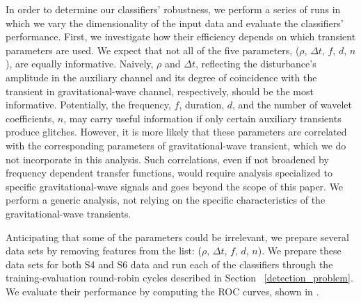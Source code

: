 \documentclass[prd, twocolumn, lengthcheck, superscriptaddress, showpacs, letterpaper, nofootinbib]{revtex4-1}
\begin{document}
In order to determine our classifiers' robustness, we perform a series of runs in which we vary the dimensionality of the input data and evaluate the classifiers' performance. First, we investigate how their efficiency depends on which transient parameters are used. We expect that not all of the five parameters, ($\rho$, $\Delta t$, $f$, $d$, $n$), are equally informative. Naively, $\rho$ and $\Delta t$, reflecting the disturbance's amplitude in the auxiliary channel and its degree of coincidence with the transient in gravitational-wave channel, respectively, should be the most informative. Potentially, the frequency, $f$, duration, $d$, and the number of wavelet coefficients, $n$, may carry useful information if only certain auxiliary transients produce glitches. However, it is more likely that these parameters are correlated with the corresponding parameters of gravitational-wave transient, which we do not incorporate in this analysis. Such correlations, even if not broadened by frequency dependent transfer functions, would require analysis specialized to specific gravitational-wave signals and goes beyond the scope of this paper. We perform a generic analysis, not relying on the specific characteristics of the gravitational-wave transients. 

Anticipating that some of the parameters could be irrelevant, we prepare several data sets by removing features from the list: ($\rho$, $\Delta t$, $f$, $d$, $n$). We prepare these data sets for both S4 and S6 data and run each of the classifiers through the training-evaluation round-robin cycles described in Section ~\ref{detection_problem}. We evaluate their performance by computing the \ac{ROC} curves, shown in . 


\graphicspath{{figures/}}
\end{document}

